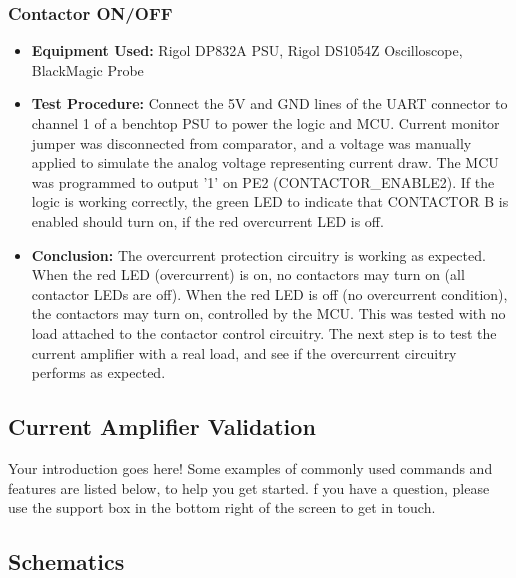 \subsection{Contactor ON/OFF}
  \begin{itemize}
        \item \textbf{Equipment Used:} Rigol DP832A PSU, Rigol DS1054Z Oscilloscope, BlackMagic Probe
        \item \textbf{Test Procedure:} Connect the 5V and GND lines of the UART connector to channel 1 of a benchtop PSU to power the logic and MCU. Current monitor jumper was disconnected from comparator, and a voltage was manually applied to simulate the analog voltage representing current draw. The MCU was programmed to output '1' on PE2 (CONTACTOR\_ENABLE2). If the logic is working correctly, the green LED to indicate that CONTACTOR B is enabled should turn on, if the red overcurrent LED is off.
        \item \textbf{Conclusion:} The overcurrent protection circuitry is working as expected. When the red LED (overcurrent) is on, no contactors may turn on (all contactor LEDs are off). When the red LED is off (no overcurrent condition), the contactors may turn on, controlled by the MCU. This was tested with no load attached to the contactor control circuitry. The next step is to test the current amplifier with a real load, and see if the overcurrent circuitry performs as expected. 
  \end{itemize}
\section{Current Amplifier Validation}
Your introduction goes here! Some examples of commonly used commands and features are listed below, to help you get started.
f you have a question, please use the support box in the bottom right of the screen to get in touch. 




\begin{versionhistory}
\end{versionhistory}

\begin{appendices}
  \chapter{Schematics}
\end{appendices}


